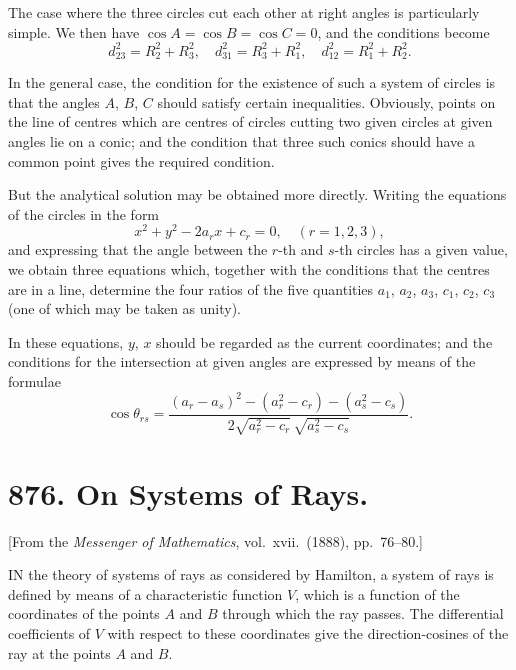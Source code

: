 \documentclass[11pt,a4paper]{book}
\begin{document}
\medskip\noindent
The case where the three circles cut each other at right angles is particularly simple. We then have $\cos A = \cos B = \cos C = 0$, and the conditions become
\[
d_{23}^{2} = R_{2}^{2} + R_{3}^{2}, \quad d_{31}^{2} = R_{3}^{2} + R_{1}^{2}, \quad d_{12}^{2} = R_{1}^{2} + R_{2}^{2}.
\]

\medskip\noindent
In the general case, the condition for the existence of such a system of circles is that the angles $A$, $B$, $C$ should satisfy certain inequalities. Obviously, points on the line of centres which are centres of circles cutting two given circles at given angles lie on a conic; and the condition that three such conics should have a common point gives the required condition.

But the analytical solution may be obtained more directly. Writing the equations of the circles in the form
\[
x^{2} + y^{2} - 2a_{r}x + c_{r} = 0, \quad (r = 1, 2, 3),
\]
and expressing that the angle between the $r$-th and $s$-th circles has a given value, we obtain three equations which, together with the conditions that the centres are in a line, determine the four ratios of the five quantities $a_{1}$, $a_{2}$, $a_{3}$, $c_{1}$, $c_{2}$, $c_{3}$ (one of which may be taken as unity).

In these equations, $y$, $x$ should be regarded as the current coordinates; and the conditions for the intersection at given angles are expressed by means of the formulae
\[
\cos \theta_{rs} = \frac{(a_{r} - a_{s})^{2} - (a_{r}^{2} - c_{r}) - (a_{s}^{2} - c_{s})}{2\sqrt{a_{r}^{2} - c_{r}}\,\sqrt{a_{s}^{2} - c_{s}}}.
\]

\newpage
\section[876]{876. On Systems of Rays.}
\label{sec:876}

[From the \textit{Messenger of Mathematics}, vol.\ xvii.\ (1888), pp.\ 76--80.]

\medskip\noindent
IN the theory of systems of rays as considered by Hamilton, a system of rays is defined by means of a characteristic function $V$, which is a function of the coordinates of the points $A$ and $B$ through which the ray passes. The differential coefficients of $V$ with respect to these coordinates give the direction-cosines of the ray at the points $A$ and $B$.
\end{document}
